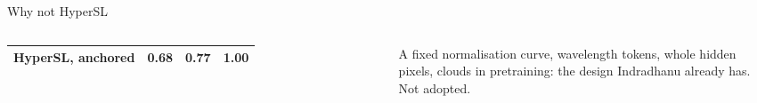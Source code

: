 \documentclass[aspectratio=169,10pt]{beamer}
\begin{document}
\begin{frame}{Why not HyperSL}
\begin{columns}[T,onlytextwidth]
{\begin{tabular}{@{}lrrr@{}}
HyperSL, anchored & 0.68 & 0.77 & 1.00\\
\bottomrule
\end{tabular}}\par
\vspace{1.5mm}
\par\vspace{0.3mm}
{\scriptsize A fixed normalisation curve, wavelength tokens, whole hidden pixels, clouds in pretraining: the design Indradhanu already has. Not adopted.\par}
\end{columns}
\end{frame}
\end{document}

